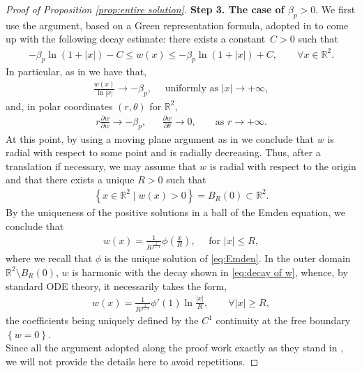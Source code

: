 \documentclass[10pt]{amsart}
\newcommand{\braces}[1]{\left\{#1\right\}} %
\newcommand{\R}{\mathbb{R}}
\def\R{\mathbb{R}}
\renewcommand{\to}{\rightarrow}
\begin{document}
\begin{proof}[Proof of Proposition \ref{prop:entire solution}]
    {\bf Step 3. The case of $\beta_p>0$}.
    We first use the argument, based on a Green representation formula, adopted in \cite{cli2} to come up with the following decay estimate:
    there exists a constant~$C>0$ such that
    \begin{align*}
        -\beta_p \ln(1+|x|) -C \leq w(x) \leq -\beta_p \ln(1+|x|) +C, \qquad \forall x\in\R^2.
    \end{align*}
    In particular, as in \cite{cli2} we have that,
    \begin{align}\label{eq:decay of w}
        \frac{w(x)}{\ln|x|} \to -\beta_p, \quad \mbox{ uniformly as } |x|\to+\infty,
    \end{align}
    and, in polar coordinates $(r,\theta)$ for $\R^2$,
    \begin{align*}
        r\frac{\partial w}{\partial w}\to -\beta_p, & & \frac{\partial w}{\partial \theta}\to 0, & & \mbox{ as } r\to+\infty.
    \end{align*}
    At this point, by using a moving plane argument as in \cite{cli2} we conclude that $w$ is radial with respect to some point and is radially decreasing.
    Thus, after a translation if necessary, we may assume that $w$ is radial with respect to the origin and that there exists a unique $R>0$ such that
    \begin{align*}
        \braces{x\in\R^2\mid w(x)>0} = B_R(0)\subset \R^2.
    \end{align*}
    By the uniqueness of the positive solutions in a ball of the Emden equation, we conclude that
    \begin{align*}
        w(x)=\frac{1}{R^{\frac{2}{p-1}}} \phi(\frac{x}{R}), \quad \mbox{ for } |x|\leq R,
    \end{align*}
    where we recall that $\phi$ is the unique solution of \eqref{eq:Emden}. In the outer domain $\R^2\setminus B_R(0)$,
    $w$ is harmonic with the decay shown in \eqref{eq:decay of w}, whence, by standard ODE theory, it
    necessarily takes the form,
    \begin{align*}
        w(x)=\frac{1}{R^{\frac{2}{p-1}}}\phi{'}(1)\ln\frac{|x|}{R},\qquad \forall |x|\geq R,
    \end{align*}
    the coefficients being uniquely defined by the $C^1$ continuity at the free boundary $\braces{w=0}$.\\
    Since all the argument adopted along the proof work exactly as they stand in \cite{cli2}, we will not provide the details here to avoid repetitions.
    \end{proof}
\end{document}
